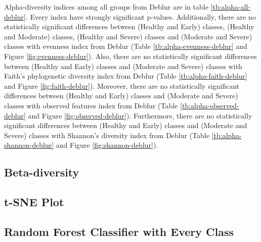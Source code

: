 \documentclass[a4paper]{article}
\begin{document}
            Alpha-diversity indices among all groups from Deblur are in table \ref{tb:alpha-all-deblur}. Every index have strongly significant p-values. Additionally, there are no statistically significant differences between (Healthy and Early) classes, (Healthy and Moderate) classes, (Healthy and Severe) classes and (Moderate and Severe) classes with evenness index from Deblur (Table \ref{tb:alpha-evenness-deblur} and Figure \ref{fig:evenness-deblur}). Also, there are no statistically significant differences between (Healthy and Early) classes and (Moderate and Severe) classes with Faith's phylogenetic diversity index from Deblur (Table \ref{tb:alpha-faith-deblur} and Figure \ref{fig:faith-deblur}). Moreover, there are no statistically significant differences between (Healthy and Early) classes and (Moderate and Severe) classes with observed features index from Deblur (Table \ref{tb:alpha-observed-deblur} and Figure \ref{fig:observed-deblur}). Furthermore, there are no statistically significant differences between (Healthy and Early) classes and (Moderate and Severe) classes with Shannon's diversity index from Deblur (Table \ref{tb:alpha-shannon-deblur} and Figure \ref{fig:shannon-deblur}).

        \subsection{Beta-diversity}

        \subsection{t-SNE Plot}

        \subsection{Random Forest Classifier with Every Class}

    
    
\end{document}
